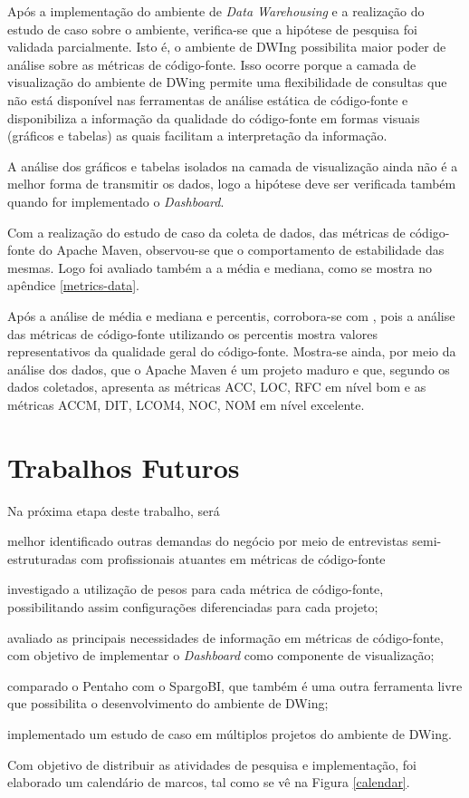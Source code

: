 Após a implementação do ambiente de \textit{Data Warehousing} e a realização do estudo de caso sobre o ambiente,  verifica-se que a hipótese de pesquisa foi validada parcialmente. Isto é, o ambiente de DWIng possibilita maior poder de análise sobre as métricas de código-fonte. Isso ocorre porque a camada de visualização do ambiente de DWing permite uma flexibilidade de consultas que não está disponível nas ferramentas de análise estática de código-fonte e disponibiliza a informação da qualidade do código-fonte em formas visuais (gráficos e tabelas) as quais facilitam a interpretação da informação.


A análise dos gráficos e tabelas isolados na camada de visualização ainda não é a melhor forma de transmitir os dados, logo a hipótese deve ser verificada também quando for implementado o \textit{Dashboard}. 


Com a realização do estudo de caso da coleta de dados, das métricas de código-fonte do Apache Maven, observou-se que o comportamento de estabilidade das mesmas. Logo foi avaliado também a a média e mediana, como se mostra no apêndice \ref{metrics-data}.

Após a análise de média e mediana e percentis, corrobora-se com , pois a análise das métricas de código-fonte utilizando os percentis mostra valores representativos da qualidade geral do código-fonte. Mostra-se ainda, por meio da análise dos dados, que o Apache Maven é um projeto maduro e que, segundo os dados coletados, apresenta as métricas ACC, LOC, RFC em nível bom e as métricas ACCM, DIT, LCOM4, NOC, NOM em nível excelente.  



\section{Trabalhos Futuros}

Na próxima etapa deste trabalho, será \begin{inparaenum}[i)] \item melhor identificado outras demandas do negócio por meio de entrevistas semi-estruturadas com profissionais atuantes em métricas de código-fonte \item investigado a utilização de pesos para cada métrica de código-fonte, possibilitando assim configurações diferenciadas para cada projeto; \item avaliado as principais necessidades de informação em métricas de código-fonte, com objetivo de implementar o \textit{Dashboard} como componente de visualização; \item comparado o Pentaho com o SpargoBI, que também é uma outra ferramenta livre que possibilita o desenvolvimento do ambiente de DWing; \item implementado um estudo de caso em múltiplos projetos do ambiente de DWing. 
\end{inparaenum}
Com objetivo de distribuir as atividades de pesquisa e implementação, foi elaborado um calendário de marcos, tal como se vê na Figura \ref{calendar}.

